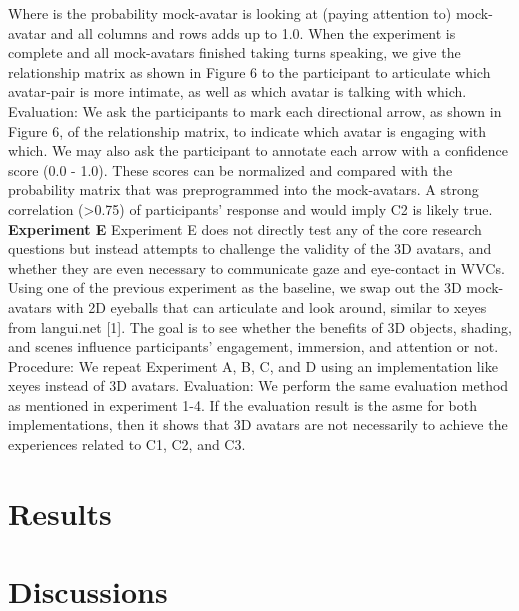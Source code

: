 \documentclass[sigconf,authordraft]{acmart}
\begin{document}
Where  is the probability mock-avatar  is looking at (paying attention to) mock-avatar  and all columns and rows adds up to 1.0. 
When the experiment is complete and all mock-avatars finished taking turns speaking, we give the relationship matrix as shown in Figure 6 to the participant to articulate which avatar-pair is more intimate, as well as which avatar is talking with which.
Evaluation: 
We ask the participants to mark each directional arrow, as shown in Figure 6, of the relationship matrix, to indicate which avatar is engaging with which. We may also ask the participant to annotate each arrow with a confidence score (0.0 - 1.0). These scores can be normalized and compared with the probability matrix  that was preprogrammed into the mock-avatars. A strong correlation (>0.75) of participants’ response and  would imply C2 is likely true.
\textbf{Experiment E}
\newline
Experiment E does not directly test any of the core research questions but instead attempts to challenge the validity of the 3D avatars, and whether they are even necessary to communicate gaze and eye-contact in WVCs. Using one of the previous experiment as the baseline, we swap out the 3D mock-avatars with 2D eyeballs that can articulate and look around, similar to xeyes from langui.net [1]. The goal is to see whether the benefits of 3D objects, shading, and scenes influence participants’ engagement, immersion, and attention or not. 
Procedure: We repeat Experiment A, B, C, and D using an implementation like xeyes instead of 3D avatars. 
Evaluation: We perform the same evaluation method as mentioned in experiment 1-4. If the evaluation result is the asme for both implementations, then it shows that 3D avatars are not necessarily to achieve the experiences related to C1, C2, and C3. 



\section{Results}
\section{Discussions}
\end{document}
